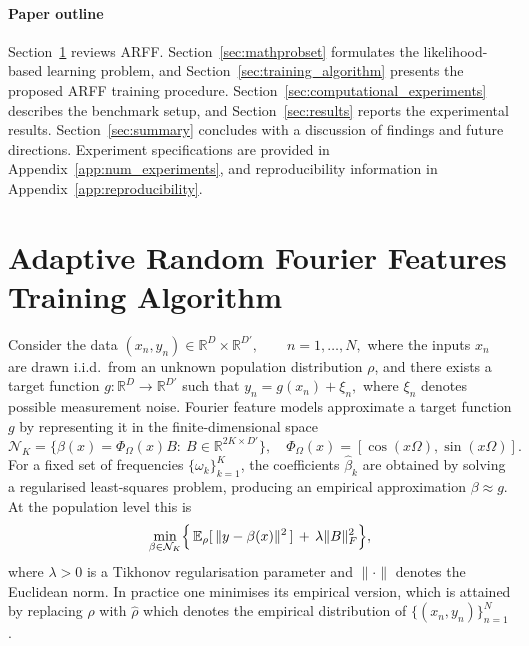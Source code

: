 \documentclass{article}
\newcommand{\E}{\mathbb{E}}
\def\E{\mathbb{E}}
\begin{document}
\paragraph{Paper outline}
Section~\ref{sec:ARFFalgorithm_updating} reviews ARFF.
Section~\ref{sec:mathprobset} formulates the likelihood-based learning problem,
and Section~\ref{sec:training_algorithm} presents the proposed ARFF training procedure.
Section~\ref{sec:computational_experiments} describes the benchmark setup,
and Section~\ref{sec:results} reports the experimental results.
Section~\ref{sec:summary} concludes with a discussion of findings and future directions.
Experiment specifications are provided in Appendix~\ref{app:num_experiments}, and reproducibility information in Appendix~\ref{app:reproducibility}.


\section{Adaptive Random Fourier Features Training Algorithm}
\label{sec:ARFFalgorithm_updating}

Consider the data $(x_n, y_n)\in\mathbb{R}^D\times\mathbb{R}^{D'},\qquad n=1,\dots,N,$
where the inputs $x_n$ are drawn i.i.d.\ from an unknown population distribution $\rho$, and there exists a target function $g:\mathbb{R}^D\to\mathbb{R}^{D'}$ such that $y_n=g(x_n) + \xi_{n},$ where $\xi_{n}$ denotes possible measurement noise. Fourier feature models approximate a target function $g$ by representing it in the finite-dimensional space
\[
\mathcal N_K=\{\beta(x)=\Phi_\Omega(x)B:\ B\in\mathbb R^{2K\times D'}\},\quad
\Phi_\Omega(x)=[\cos(x\Omega),\sin(x\Omega)].
\]
For a fixed set of frequencies $\{\omega_k\}_{k=1}^K$, the coefficients $\hat{\beta}_k$ are obtained by solving a regularised least-squares problem, producing an empirical approximation $\beta \approx g$. At the population level this is
\begin{equation}
\label{eq:regularised_loss}
\min_{\beta\in\mathcal{N}_K}
\Bigl\{\,
\E_{\rho}[\,\|y-\beta(x)\|^2\,]
\,+\,
\lambda\|B\|_F^2
\Bigr\},
\end{equation}
where $\lambda>0$ is a Tikhonov regularisation parameter and $\|\cdot\|$ denotes the Euclidean norm. In practice one minimises its empirical version, which is attained by replacing $\rho$ with $\hat{\rho}$ which denotes the empirical distribution of $\{(x_n, y_n)\}_{n=1}^N$.
\end{document}
